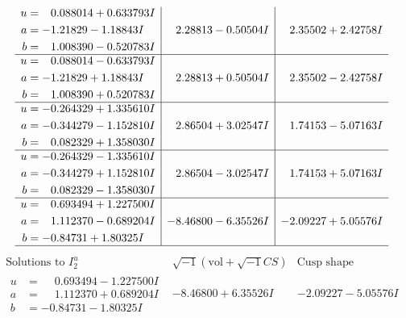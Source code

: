 \documentclass[1p]{elsarticle_modified}
\theoremstyle{definition}
\newcommand{\I}{\sqrt{-1}}
\begin{document}
$$\begin{array}{c|c|c}
\begin{aligned}
u &= \phantom{-}0.088014 + 0.633793 I \\
a &= -1.21829 - 1.18843 I \\
b &= \phantom{-}1.008390 - 0.520783 I\end{aligned}
 & \phantom{-}2.28813 - 0.50504 I & \phantom{-}2.35502 + 2.42758 I \\ \hline\begin{aligned}
u &= \phantom{-}0.088014 - 0.633793 I \\
a &= -1.21829 + 1.18843 I \\
b &= \phantom{-}1.008390 + 0.520783 I\end{aligned}
 & \phantom{-}2.28813 + 0.50504 I & \phantom{-}2.35502 - 2.42758 I \\ \hline\begin{aligned}
u &= -0.264329 + 1.335610 I \\
a &= -0.344279 - 1.152810 I \\
b &= \phantom{-}0.082329 + 1.358030 I\end{aligned}
 & \phantom{-}2.86504 + 3.02547 I & \phantom{-}1.74153 - 5.07163 I \\ \hline\begin{aligned}
u &= -0.264329 - 1.335610 I \\
a &= -0.344279 + 1.152810 I \\
b &= \phantom{-}0.082329 - 1.358030 I\end{aligned}
 & \phantom{-}2.86504 - 3.02547 I & \phantom{-}1.74153 + 5.07163 I \\ \hline\begin{aligned}
u &= \phantom{-}0.693494 + 1.227500 I \\
a &= \phantom{-}1.112370 - 0.689204 I \\
b &= -0.84731 + 1.80325 I\end{aligned}
 & -8.46800 - 6.35526 I & -2.09227 + 5.05576 I\\
 \hline 
 \end{array}$$\newpage$$\begin{array}{c|c|c}  
\text{Solutions to }I^u_{2}& \I (\text{vol} + \sqrt{-1}CS) & \text{Cusp shape}\\
 \hline 
\begin{aligned}
u &= \phantom{-}0.693494 - 1.227500 I \\
a &= \phantom{-}1.112370 + 0.689204 I \\
b &= -0.84731 - 1.80325 I\end{aligned}
 & -8.46800 + 6.35526 I & -2.09227 - 5.05576 I \\ \hline\begin{aligned}

\end{aligned}
\end{array}$$
\end{document}
